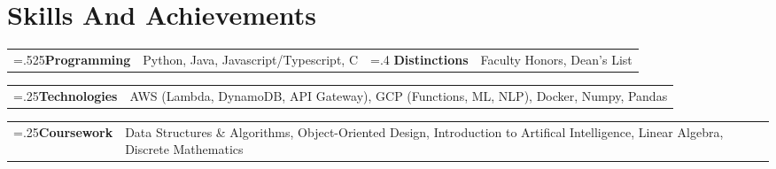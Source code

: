 \documentclass[10pt]{article}
\newcommand{\onelinecontent}[2]
    {
        \small\textbf{#1} & #2
    }
\begin{document}
                                \section{Skills And Achievements}
                    \begin{flushleft}
                                                            \begin{tabularx}{\linewidth}{
                        >{\hsize=.525\hsize}X%
                        >{\hsize=1.475\hsize}X%
                        >{\hsize=.4\hsize}X%
                        >{\hsize=1.6\hsize}X%
                        }
                        \onelinecontent{Programming}{Python, Java, Javascript/Typescript, C}  &   \onelinecontent{Distinctions}{Faculty Honors, Dean's List} \\
                        \end{tabularx}
                                                                                \begin{tabularx}{\linewidth}{
                            >{\hsize=.25\hsize}X%
                            >{\hsize=1.75\hsize}X%
                            }
                            \onelinecontent{Technologies}{AWS (Lambda, DynamoDB, API Gateway), GCP (Functions, ML, NLP), Docker, Numpy, Pandas} \\
                        \end{tabularx}
                                                                                \begin{tabularx}{\linewidth}{
                            >{\hsize=.25\hsize}X%
                            >{\hsize=1.75\hsize}X%
                            }
                            \onelinecontent{Coursework}{Data Structures \& Algorithms, Object-Oriented Design, Introduction to Artifical Intelligence, Linear Algebra, Discrete Mathematics} \\
                        \end{tabularx}
                                    

            \end{flushleft}
            
\end{document}
